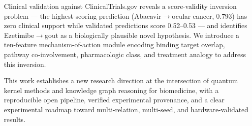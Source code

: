 \documentclass[twocolumn,10pt]{article}
\begin{document}
Clinical validation against ClinicalTrials.gov reveals a score-validity inversion problem --- the highest-scoring prediction (Abacavir$\to$ocular cancer, 0.793) has zero clinical support while validated predictions score 0.52--0.53 --- and identifies Ezetimibe$\to$gout as a biologically plausible novel hypothesis. We introduce a ten-feature mechanism-of-action module encoding binding target overlap, pathway co-involvement, pharmacologic class, and treatment analogy to address this inversion.

This work establishes a new research direction at the intersection of quantum kernel methods and knowledge graph reasoning for biomedicine, with a reproducible open pipeline, verified experimental provenance, and a clear experimental roadmap toward multi-relation, multi-seed, and hardware-validated results.

\end{document}
